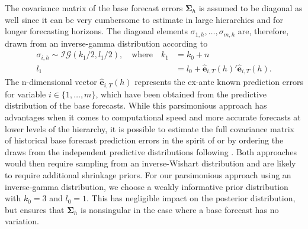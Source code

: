 \documentclass[a4paper,fleqn,11pt]{article}
\begin{document}
The covariance matrix of the base forecast errors $\boldsymbol{\Sigma}_h$ is assumed to be diagonal as well since it can be very cumbersome to estimate in large hierarchies and for longer forecasting horizons. The diagonal elements $\sigma_{1,h}, \hdots, \sigma_{m,h}$ are, therefore, drawn from an inverse-gamma distribution according to
\begin{align*}
	\sigma_{i,h} \sim \mathcal{IG}(k_1/2,l_1/2), \quad \text{where} \quad k_1 &= k_0 + n\\
	l_1 &= l_0 + \mathbf{\hat{e}}_{i,T}(h)'\mathbf{\hat{e}}_{i,T}(h).
\end{align*}
The n-dimensional vector $\mathbf{\hat{e}}_{i,T}(h)$ represents the ex-ante known prediction errors for variable $i \in \{1, \hdots, m\}$, which have been obtained from the predictive distribution of the base forecasts. While this parsimonious approach has advantages when it comes to computational speed and more accurate forecasts at lower levels of the hierarchy, it is possible to estimate the full covariance matrix of historical base forecast prediction errors in the spirit of \cite{Wickramasuriya2015} or by ordering the draws from the independent predictive distributions following \cite{Jeon2019}. Both approaches would then require sampling from an inverse-Wishart distribution and are likely to require additional shrinkage priors. For our parsimonious approach using an inverse-gamma distribution, we choose a weakly informative prior distribution with $k_0 = 3$ and $l_0 = 1$. This has negligible impact on the posterior
distribution, but ensures that $\boldsymbol{\Sigma}_h$ is nonsingular in the case where a base forecast has no
variation.
\end{document}
